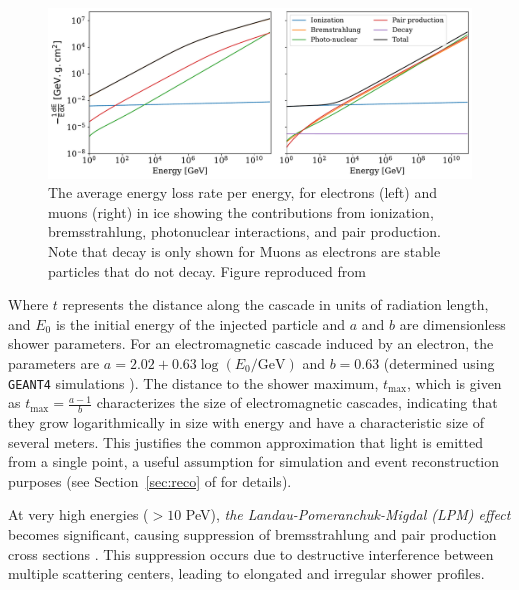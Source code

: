 \begin{figure}
	\centering \includegraphics{./figures/nu_in_icecube/energylosses.pdf}
	\caption{The average energy loss rate per energy, for electrons (left) and muons (right) in
    ice showing the contributions from ionization, bremsstrahlung, photonuclear interactions, and pair production. Note that decay is only shown for Muons as electrons are stable particles that do not decay. Figure reproduced from \cite{MMC_paper}}
\end{figure}


Where $t$ represents the distance along the cascade in units of radiation length, and $E_0$ is the initial energy of the injected particle and $a$ and $b$ are dimensionless shower parameters. For an electromagnetic cascade induced by an electron, the parameters are $a = 2.02 + 0.63 \log(E_0/\text{GeV})$ and $b = 0.63$ (determined using \texttt{GEANT4} simulations  ). The distance to the shower maximum, $t_{\text{max}}$, which is given as $t_{\text{max}}=\frac{a-1}{b}$ characterizes the size of electromagnetic cascades, indicating that they grow logarithmically in size with energy and have a characteristic size of several meters. This justifies the common approximation that light is emitted from a single point, a useful assumption for simulation and event reconstruction purposes (see Section~\ref{sec:reco} of  for details).

At very high energies ($>10$ PeV), \emph{the Landau-Pomeranchuk-Migdal (LPM) effect} becomes significant, causing suppression of bremsstrahlung and pair production cross sections . This suppression occurs due to destructive interference between multiple scattering centers, leading to elongated and irregular shower profiles.

